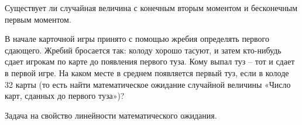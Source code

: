 
\begin{comment}
\begin{problem}
Сто паровозов выехали из города по однополосной линии, каждый с постоянной скоростью. Когда движение установилось, то из-за того, что быстрые догнали идущих впереди более медленных, образовались караваны (группы, движущиеся со скоростью лидера). Найдите м.о. и дисперсию числа караванов. Скорости различных паровозов независимы и одинаково распределены, а функция распределения скорости непрерывна.
\end{problem}

\begin{problem}
Согласно законам о трудоустройстве в городе \textit{N}, наниматели обязаны предоставить всем рабочим выходной, если хотя бы у одного из них день рождения, и принимать на службу рабочих независимо от их дня рождения. За исключением этих выходных рабочие трудятся весь год из 365 дней. Предприниматели хотят максимизировать среднее число человеко-дней в году. Сколько рабочих трудятся на фабрике в городе \textit{N}?

\end{problem}

\end{comment}

\begin{problem}
Существует ли случайная величина с конечным вторым моментом и бесконечным первым моментом.
\end{problem}

\begin{problem}
В начале карточной игры принято с помощью жребия определять первого сдающего. Жребий бросается так: колоду хорошо тасуют, и затем кто-нибудь сдает игрокам по карте до появления первого туза. Кому выпал туз -- тот и сдает в первой игре. На каком месте в среднем появляется первый туз, если в колоде 32 карты (то есть найти математическое ожидание случайной величины «Число карт, сданных до первого туза»)?

\begin{ordre} 
Задача на свойство линейности математического ожидания.
\end{ordre}

\end{problem}

